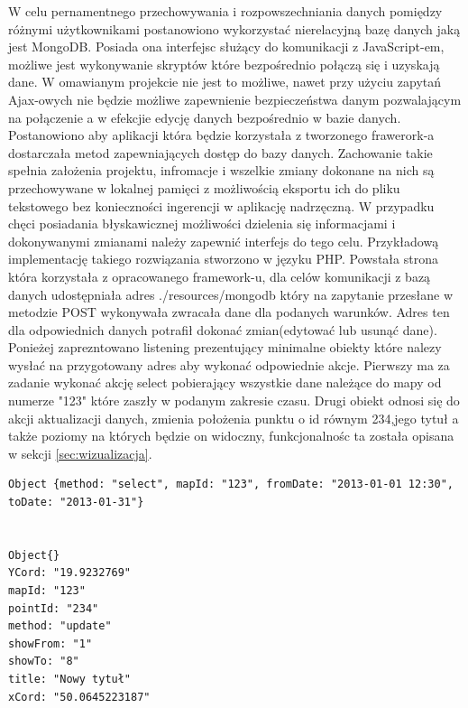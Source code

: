 W celu pernamentnego przechowywania i rozpowszechniania danych pomiędzy różnymi użytkownikami postanowiono wykorzystać nierelacyjną bazę danych jaką jest MongoDB. Posiada ona interfejsc służący do komunikacji z JavaScript-em, możliwe jest wykonywanie skryptów które bezpośrednio połączą się i uzyskają dane\cite{mongojs}. W omawianym projekcie nie jest to możliwe, nawet przy użyciu zapytań Ajax-owych nie będzie możliwe zapewnienie bezpieczeństwa danym pozwalającym na połączenie a w efekcjie edycję danych bezpośrednio w bazie danych.
Postanowiono aby aplikacji która będzie korzystała z tworzonego frawerork-a dostarczała metod zapewniających dostęp do bazy danych. Zachowanie takie spełnia założenia projektu, infromacje i wszelkie zmiany dokonane na nich są przechowywane w lokalnej pamięci z możliwością eksportu ich do pliku tekstowego bez konieczności ingerencji w aplikację nadrzęczną. W przypadku chęci posiadania błyskawicznej możliwości dzielenia się informacjami i dokonywanymi zmianami należy zapewnić interfejs do tego celu. Przykładową implementację takiego rozwiązania stworzono w języku PHP. Powstała strona która korzystała z opracowanego framework-u, dla celów komunikacji z bazą danych udostępniała adres ./resources/mongodb który na zapytanie przesłane w metodzie POST wykonywała zwracała dane dla podanych warunków. Adres ten dla odpowiednich danych potrafił dokonać zmian(edytować lub usunąć dane).
Ponieżej zaprezntowano listening prezentujący minimalne obiekty które nalezy wysłać na przygotowany adres aby wykonać odpowiednie akcje. Pierwszy ma za zadanie wykonać akcję select pobierający wszystkie dane należące do mapy od numerze "123" które zaszły w podanym zakresie czasu. Drugi obiekt odnosi się do akcji aktualizacji danych, zmienia położenia punktu o id równym 234,jego tytuł a także poziomy na których będzie on widoczny, funkcjonalnośc ta została opisana w sekcji  \ref{sec:wizualizacja}.

\lstset{language=JavaScript}
\begin{lstlisting}[caption=caption2]
Object {method: "select", mapId: "123", fromDate: "2013-01-01 12:30", toDate: "2013-01-31"}


Object{}
YCord: "19.9232769"
mapId: "123"
pointId: "234"
method: "update"
showFrom: "1"
showTo: "8"
title: "Nowy tytuł"
xCord: "50.0645223187"

\end{lstlisting}



